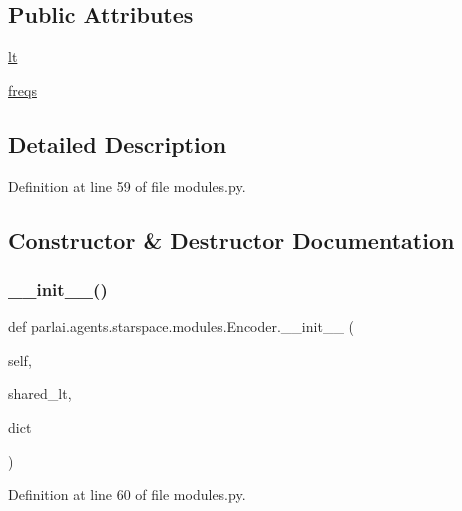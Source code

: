 \subsection*{Public Attributes}
\begin{DoxyCompactItemize}
\item 
\hyperlink{classparlai_1_1agents_1_1starspace_1_1modules_1_1Encoder_a86957630e34a988b80074fbaeae14d7a}{lt}
\item 
\hyperlink{classparlai_1_1agents_1_1starspace_1_1modules_1_1Encoder_aaf45c31c5a3014cef4892cf836ebedb0}{freqs}
\end{DoxyCompactItemize}


\subsection{Detailed Description}


Definition at line 59 of file modules.\+py.



\subsection{Constructor \& Destructor Documentation}
\mbox{\label{classparlai_1_1agents_1_1starspace_1_1modules_1_1Encoder_a79b219a2d25de040514ebd76c15053a3}} 
\subsubsection{\texorpdfstring{\+\_\+\+\_\+init\+\_\+\+\_\+()}{\_\_init\_\_()}}
{\footnotesize\ttfamily def parlai.\+agents.\+starspace.\+modules.\+Encoder.\+\_\+\+\_\+init\+\_\+\+\_\+ (\begin{DoxyParamCaption}\item[{}]{self,  }\item[{}]{shared\+\_\+lt,  }\item[{}]{dict }\end{DoxyParamCaption})}



Definition at line 60 of file modules.\+py.



